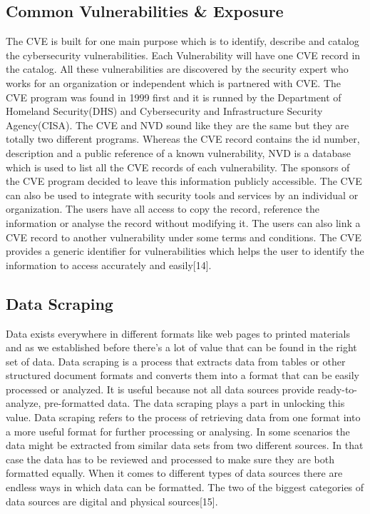 \subsection{Common Vulnerabilities \& Exposure}
The \acs{CVE} is built for one main purpose which is to identify, describe and catalog the cybersecurity vulnerabilities. Each Vulnerability will have one \acs{CVE} record in the catalog. All these vulnerabilities are discovered by the security expert  who works for an organization or independent which is partnered with \acs{CVE}. The \acs{CVE} program was found in 1999 first and it is runned by the Department of Homeland Security(DHS) and Cybersecurity and Infrastructure Security Agency(CISA). The \acs{CVE} and \acs{NVD} sound like they are the same but they are totally two different programs. Whereas the \acs{CVE} record contains the id number, description and a public reference of a known vulnerability, \acs{NVD} is a database which is used to list all the \acs{CVE} records of each vulnerability. The sponsors of the \acs{CVE} program decided to leave this information publicly accessible. The \acs{CVE} can also be used to integrate with security tools and services by an individual or organization. The users have all access to copy the record, reference the information or analyse the record without modifying it. The users can also link a \acs{CVE} record to another vulnerability under some terms and conditions. The \acs{CVE} provides a generic identifier for vulnerabilities  which helps the user to identify the information to access accurately and easily[14]. 
%

\subsection{Data Scraping}
Data exists everywhere in different formats like web pages to printed materials and as we established before there’s a lot of value that can be found in the right set of data. Data scraping is a process that extracts data from tables or other structured document formats and converts them into a format that can be easily processed or analyzed. It is useful because not all data sources provide ready-to-analyze, pre-formatted data. The data scraping plays a part in unlocking this value. Data scraping refers to the process of retrieving data from one format into a more useful format for further processing or analysing. In some scenarios the data might be extracted from similar data sets from two different sources. In that case the data has to be reviewed and processed to make sure they are both formatted equally. When it comes to different types of data sources there are endless ways in which data can be formatted. The two of the biggest categories of data sources are digital and physical sources[15].
